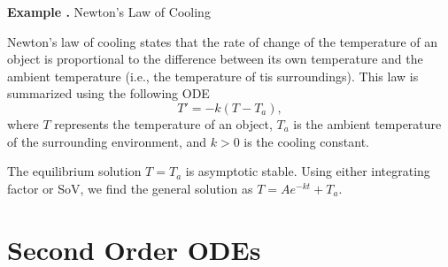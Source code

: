 \documentclass[12pt, a4paper]{article}
\newcounter{index}[subsection]
\newenvironment*{eg}{\begin{framed}\par\noindent\textbf{Example \thesubsection.\stepcounter{index}\theindex}}{\par\end{framed}}
\begin{document}
\begin{eg}
	Newton's Law of Cooling\par 
	Newton's law of cooling states that the rate of change of the temperature of an object is proportional to the difference between its own temperature and the ambient temperature (i.e., the temperature of tis surroundings). This law is summarized using the following ODE \[T'=-k(T-T_a),\] where $T$ represents the temperature of an object, $T_a$ is the ambient temperature of the surrounding environment, and $k>0$ is the cooling constant. \par The equilibrium solution $T=T_a$ is asymptotic stable. Using either integrating factor or SoV, we find the general solution as $T=Ae^{-kt}+T_a.$
\end{eg}

\newpage
\section{Second Order ODEs}
\end{document}

